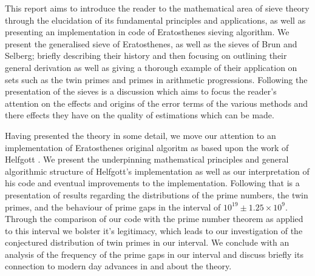 This report aims to introduce the reader to the mathematical area of sieve theory through the elucidation of its fundamental principles and applications, as well as presenting an implementation in code of Eratosthenes sieving algorithm. 
We present the generalised sieve of Eratosthenes, as well as the sieves of Brun and Selberg; briefly describing their history and then focusing on outlining their general derivation as well as giving a thorough example of their application on sets such as the twin primes and primes in arithmetic progressions. 
Following the presentation of the sieves is a discussion which aims to focus the reader's attention on the effects and origins of the error terms of the various methods and there effects they have on the quality of estimations which can be made.

Having presented the theory in some detail, we move our attention to an implementation of Eratosthenes original algoritm as based upon the work of Helfgott \cite{HaraldSieve}.
We present the underpinning mathematical principles and general algorithmic structure of Helfgott's implementation as well as our interpretation of his code and eventual improvements to the implementation.
Following that is a presentation of results regarding the distributions of the prime numbers, the twin primes, and the behaviour of prime gaps in the interval of \(10^{19}\pm 1.25\times10^9\).
Through the comparison of our code with the prime number theorem as applied to this interval we bolster it's legitimacy, which leads to our investigation of the conjectured distribution of twin primes in our interval.
We conclude with an analysis of the frequency of the prime gaps in our interval and discuss briefly its connection to modern day advances in and about the theory.